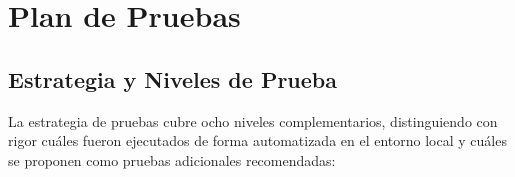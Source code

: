\documentclass[12pt,a4paper]{article}
\begin{document}
\section{Plan de Pruebas}

\subsection{Estrategia y Niveles de Prueba}
La estrategia de pruebas cubre ocho niveles complementarios, distinguiendo con rigor cu\'ales fueron ejecutados de forma automatizada en el entorno local y cu\'ales se proponen como pruebas adicionales recomendadas:
\end{document}
